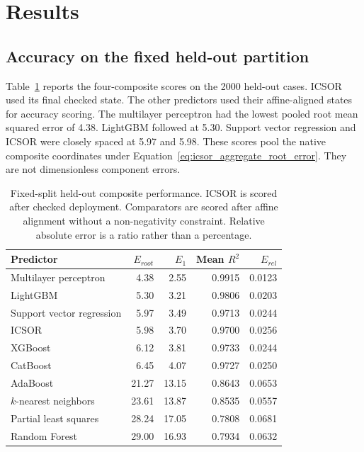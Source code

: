 \section{Results}
\label{sec:icsor_results}

\subsection{Accuracy on the fixed held-out partition}

Table~\ref{tab:icsor_fixed_results} reports the four-composite scores on the 2000 held-out cases. ICSOR used its final checked state. The other predictors used their affine-aligned states for accuracy scoring. The multilayer perceptron had the lowest pooled root mean squared error of 4.38. LightGBM followed at 5.30. Support vector regression and ICSOR were closely spaced at 5.97 and 5.98. These scores pool the native composite coordinates under Equation~\eqref{eq:icsor_aggregate_root_error}. They are not dimensionless component errors.

\begin{table}[htbp]
\centering\small
\caption{Fixed-split held-out composite performance. ICSOR is scored after checked deployment. Comparators are scored after affine alignment without a non-negativity constraint. Relative absolute error is a ratio rather than a percentage.}
\label{tab:icsor_fixed_results}
\begin{tabular}{p{4.7cm}rrrr}
\toprule
Predictor & $E_{root}$ & $E_1$ & Mean $R^2$ & $E_{rel}$\\
\midrule
Multilayer perceptron & 4.38 & 2.55 & 0.9915 & 0.0123\\
LightGBM & 5.30 & 3.21 & 0.9806 & 0.0203\\
Support vector regression & 5.97 & 3.49 & 0.9713 & 0.0244\\
ICSOR & 5.98 & 3.70 & 0.9700 & 0.0256\\
XGBoost & 6.12 & 3.81 & 0.9733 & 0.0244\\
CatBoost & 6.45 & 4.07 & 0.9727 & 0.0250\\
AdaBoost & 21.27 & 13.15 & 0.8643 & 0.0653\\
$k$-nearest neighbors & 23.61 & 13.87 & 0.8535 & 0.0557\\
Partial least squares & 28.24 & 17.05 & 0.7808 & 0.0681\\
Random Forest & 29.00 & 16.93 & 0.7934 & 0.0632\\
\bottomrule
\end{tabular}
\end{table}


